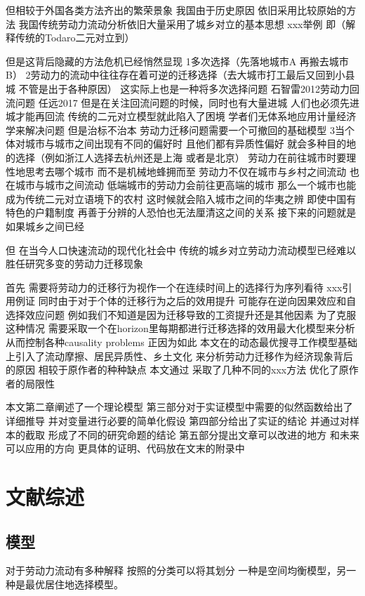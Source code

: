 \documentclass[10pt,a4paper]{article}
\begin{document}
但相较于外国各类方法齐出的繁荣景象
我国由于历史原因
依旧采用比较原始的方法
我国传统劳动力流动分析依旧大量采用了城乡对立的基本思想
xxx举例
即（解释传统的Todaro二元对立到）

但是这背后隐藏的方法危机已经悄然显现
1多次选择（先落地城市A 再搬去城市B）
2劳动力的流动中往往存在着可逆的迁移选择（去大城市打工最后又回到小县城 不管是出于各种原因） 这实际上也是一种将多次选择问题 
石智雷2012劳动力回流问题
任远2017
但是在关注回流问题的时候，同时也有大量进城
人们也必须先进城才能再回流
传统的二元对立模型就此陷入了困境 学者们无体系地应用计量经济学来解决问题 但是治标不治本
劳动力迁移问题需要一个可撤回的基础模型
3当个体对城市与城市之间出现有不同的偏好时 且他们都有异质性偏好 就会多种目的地的选择（例如浙江人选择去杭州还是上海 或者是北京）
劳动力在前往城市时要理性地思考去哪个城市 而不是机械地蜂拥而至
劳动力不仅在城市与乡村之间流动 也在城市与城市之间流动
低端城市的劳动力会前往更高端的城市 那么一个城市也能成为传统二元对立语境下的农村 这时候就会陷入城市之间的华夷之辨 即使中国有特色的户籍制度 再善于分辨的人恐怕也无法厘清这之间的关系 接下来的问题就是如果城乡之间已经

但
在当今人口快速流动的现代化社会中
传统的城乡对立劳动力流动模型已经难以胜任研究多变的劳动力迁移现象

首先
需要将劳动力的迁移行为视作一个在连续时间上的选择行为序列看待
xxx引用例证
同时由于对于个体的迁移行为之后的效用提升
可能存在逆向因果效应和自选择效应问题
例如我们不知道是因为迁移导致的工资提升还是其他因素
为了克服这种情况
需要采取一个在horizon里每期都进行迁移选择的效用最大化模型来分析
从而控制各种causality problems
正因为如此
本文在\cite{kennanEffectExpectedIncome2011}的动态最优搜寻工作模型基础上引入了流动摩擦、居民异质性、乡土文化
来分析劳动力迁移作为经济现象背后的原因
相较于原作者的种种缺点
本文通过
采取了几种不同的xxx方法
优化了原作者的局限性

本文第二章阐述了一个理论模型
第三部分对于实证模型中需要的似然函数给出了详细推导 并对变量进行必要的简单化假设
第四部分给出了实证的结论 并通过对样本的截取 形成了不同的研究命题的结论
第五部分提出文章可以改进的地方 和未来可以应用的方向
更具体的证明、代码放在文末的附录中




\section{文献综述}



\subsection{模型}
对于劳动力流动有多种解释
按照\cite{jiaEconomicsInternalMigration2023}的分类可以将其划分
一种是空间均衡模型，另一种是最优居住地选择模型。
\end{document}
